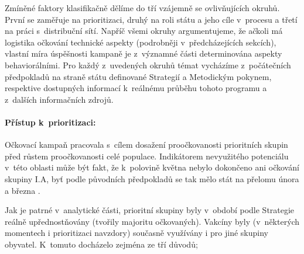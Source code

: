 Zmíněné faktory klasifikačně dělíme do tří vzájemně se ovlivňujících okruhů. První se zaměřuje na prioritizaci, druhý na roli státu a jeho cíle v~procesu a třetí na práci s~distribuční sítí. %
%
Napříč všemi okruhy argumentujeme, že ačkoli má logistika očkování technické aspekty (podrobněji v~předcházejících sekcích), vlastní míra úspěšnosti kampaně je z~významné části determinována aspekty behaviorálními. Pro každý z~uvedených okruhů témat vycházíme z~počátečních předpokladů na straně státu definované Strategií a Metodickým pokynem, respektive dostupných informací k~reálnému průběhu tohoto programu a z~dalších informačních zdrojů.


\paragraph{Přístup k~prioritizaci:} Očkovací kampaň pracovala s~cílem dosažení pro\-oč\-ko\-va\-nos\-ti prioritních skupin před růstem pro\-oč\-ko\-va\-nos\-ti celé populace. Indikátorem nevyužitého potenciálu v~této oblasti může být fakt, že k~polovině května nebylo dokončeno ani očkování skupiny I.A, byť podle původních předpokladů se tak mělo stát na přelomu února a března \cite{ockovani_mp}.



Jak je patrné v~analytické části, prioritní skupiny byly v~období podle Strategie reálně upřednostňovány (tvořily majoritu očkovaných). Vakcíny byly (v~některých momentech i prioritizaci navzdory) současně využívány i pro jiné skupiny obyvatel. K~tomuto docházelo zejména ze tří důvodů;
%

